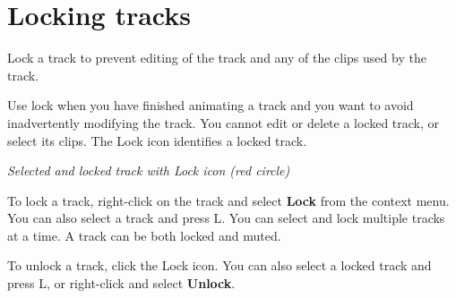 \chapter{Locking tracks}
\hypertarget{md__library_2_package_cache_2com_8unity_8timeline_0d1_87_86_2_documentation_0i_2trk__lock}{}\label{md__library_2_package_cache_2com_8unity_8timeline_0d1_87_86_2_documentation_0i_2trk__lock}
\label{md__library_2_package_cache_2com_8unity_8timeline_0d1_87_86_2_documentation_0i_2trk__lock_autotoc_md1260}%
%
 Lock a track to prevent editing of the track and any of the clips used by the track.

Use lock when you have finished animating a track and you want to avoid inadvertently modifying the track. You cannot edit or delete a locked track, or select its clips. The Lock icon identifies a locked track.



{\itshape Selected and locked track with Lock icon (red circle)}

To lock a track, right-\/click on the track and select {\bfseries{Lock}} from the context menu. You can also select a track and press L. You can select and lock multiple tracks at a time. A track can be both locked and muted.

To unlock a track, click the Lock icon. You can also select a locked track and press L, or right-\/click and select {\bfseries{Unlock}}. 